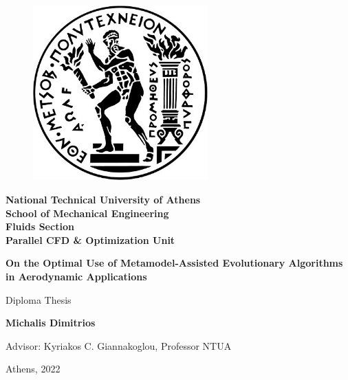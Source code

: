 \documentclass[twoside, 12pt,notitlepage]{report}
\begin{document}
\begin{titlepage}
\begin{figure}
\includegraphics[width=0.6\textwidth]{NTUA}
\end{figure}

\hspace{-8mm}
\textbf{National Technical University of Athens} \\
\textbf{School of Mechanical Engineering} \\
\textbf{Fluids Section} \\
\textbf{Parallel CFD \& Optimization Unit} \\

\vspace{3mm}
\hspace{-3mm}
\begin{center}
    \vspace*{3cm}
       \textbf{On the Optimal Use of Metamodel-Assisted 
Evolutionary Algorithms in Aerodynamic Applications}

       \vspace{2cm}
        Diploma Thesis
            
       \vspace{1cm}

       \textbf{Michalis Dimitrios}

       \vspace{5cm}
            
       Advisor: Kyriakos C. Giannakoglou, Professor NTUA
            
       \vspace{0.8cm}
            
		Athens, 2022      
            
\end{center}

\end{titlepage}
\end{document}
